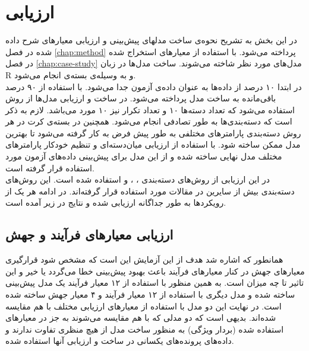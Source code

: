 \chapter{ارزیابی}
\label{chap:evaluation}
در این بخش به تشریح نحوه‌ی ساخت مدلهای پیش‌بینی و ارزیابی معیارهای شرح داده شده در فصل \ref{chap:method} پرداخته می‌شود. با استفاده از معیارهای استخراج شده در فصل \ref{chap:case-study} مدل‌های مورد نظر شاخته می‌شوند. ساخت مدل‌ها در زبان R و به وسیله‌ی بسته‌ی  \cite{kuhn2008caret} انجام می‌شود.\\
در ابتدا ۱۰ درصد از داده‌ها به عنوان داده‌ی آزمون جدا می‌شود. با استفاده از ۹۰ درصد باقی‌مانده به ساخت مدل پرداخته می‌شود. در ساخت و ارزیابی مدل‌ها از روش  استفاده می‌شود که تعداد دسته‌ها ۱۰ و تعداد تکرار نیز ۱۰ مورد می‌باشد. لازم به ذکر است که دسته‌بندی‌ها به طور تصادفی انجام می‌شود.  همچنین در بسته‌ی کرت در هر روش دسته‌بندی پارامترهای مختلفی به طور پیش فرض به کار گرفته می‌شود تا بهترین مدل ممکن ساخته شود.  با استفاده از ارزیابی میان‌دسته‌ای و تنظیم خودکار پارامترهای مختلف مدل نهایی ساخته شده و از این مدل برای پیش‌بینی داده‌های آزمون مورد استفاده قرار گرفته است.  \\
در این ارزیابی از  روش‌های دسته‌بندی ، ،  و  استفاده شده است. این روش‌های دسته‌بندی بیش از سایرین در مقالات مورد استفاده قرار گرفته‌اند. در ادامه هر یک از رویکردها به طور جداگانه ارزیابی شده و نتایج در زیر آمده است. 


\section{ارزیابی معیارهای فرآیند و جهش}
همانطور که اشاره شد هدف از این آزمایش این است که مشخص شود قرارگیری معیارهای جهش در کنار معیارهای فرآیند باعث بهبود پیش‌بینی خطا می‌گردد یا خیر و این تاثیر تا چه میزان است. به همین منظور  با استفاده از ۱۲ معیار فرآیند یک مدل پیش‌بینی ساخته شده و مدل دیگری  با استفاده از ۱۲ معیار فرآیند و ۴ معیار جهش ساخته شده است. در نهایت این دو مدل با استفاده از معیارهای ارزیابی مختلف با هم مقایسه شده‌اند. بدیهی است که دو مدلی که با هم مقایسه می‌شوند به جز در معیارهای استفاده شده (بردار ویژگی) به منظور ساخت مدل از هیچ منظری تفاوت ندارند و داده‌های  پرونده‌های یکسانی در ساخت و ارزیابی آنها استفاده شده. \\

